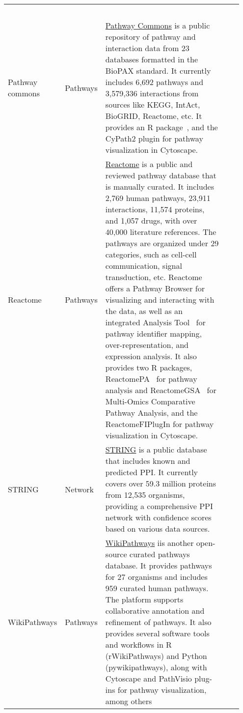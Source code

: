 \begin{newpdflayout}{210mm}{297mm}
\begin{longtable}{@{} 
  p{0.10\linewidth}@{\hspace{6pt}} 
  p{0.08\linewidth}@{\hspace{6pt}} 
  p{0.69\linewidth}@{\hspace{6pt}} 
  p{0.08\linewidth} 
@{}}
  ~\cite{RN91} \\
Pathway commons  & Pathways &
  \href{https://www.pathwaycommons.org/}{Pathway Commons} is a public repository of pathway and interaction data from 23 databases formatted in the BioPAX standard. It currently includes 6,692 pathways and 3,579,336 interactions from sources like KEGG, IntAct, BioGRID, Reactome, etc. It provides an R package~\cite{RN151}, and the CyPath2 plugin for pathway visualization in Cytoscape. &
  ~\cite{RN142} \\
Reactome & Pathways &
  \href{https://reactome.org/}{Reactome} is a public and reviewed pathway database that is manually curated. It includes 2,769 human pathways, 23,911 interactions, 11,574 proteins, and 1,057 drugs, with over 40,000 literature references. The pathways are organized under 29 categories, such as cell-cell communication, signal transduction, etc. Reactome offers a Pathway Browser for visualizing and interacting with the data, as well as an integrated Analysis Tool~\cite{RN150} for pathway identifier mapping, over-representation, and expression analysis. It also provides two R packages, ReactomePA~\cite{RN148} for pathway analysis and ReactomeGSA~\cite{RN149} for Multi-Omics Comparative Pathway Analysis, and the ReactomeFIPlugIn for pathway visualization in Cytoscape. &
  ~\cite{RN150} \\
STRING & Network & 
  \href{https://string-db.org/}{STRING} is a public database that includes known and predicted \gls{PPI}. It currently covers over 59.3 million proteins from 12,535 organisms, providing a comprehensive \gls{PPI} network with confidence scores based on various data sources. &
  ~\cite{RN72} \\
WikiPathways & Pathways &
  \href{https://www.wikipathways.org/}{WikiPathways} iis another open-source curated pathways database. It provides pathways for 27 organisms and includes 959 curated human pathways. The platform supports collaborative annotation and refinement of pathways. It also provides several software tools and workflows in R (rWikiPathways) and Python (pywikipathways), along with Cytoscape and PathVisio plug-ins for pathway visualization, among others~\cite{RN147} &
  ~\cite{RN144} \\
\end{longtable}

\end{newpdflayout}


